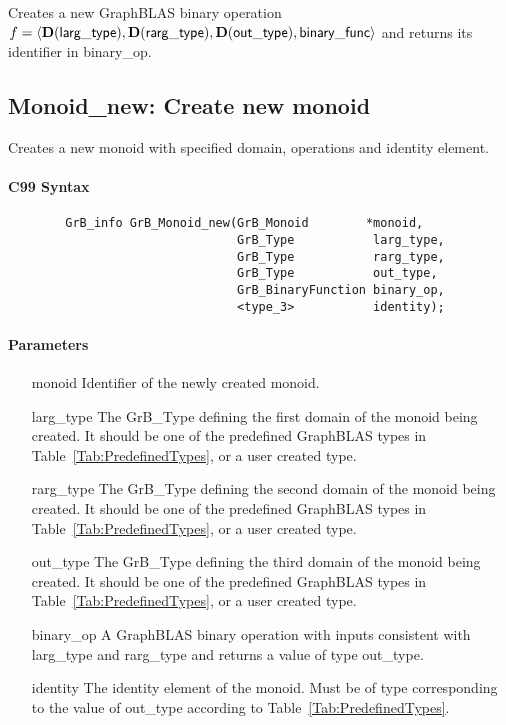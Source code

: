 Creates a new GraphBLAS binary operation $f = \langle \bold{D}({\sf larg\_type}), 
\bold{D}({\sf rarg\_type}), \bold{D}({\sf out\_type}), {\sf binary\_func} \rangle$ and returns its identifier in {\sf binary\_op}.




\subsection{{\sf Monoid\_new}: Create new monoid}

Creates a new monoid with specified domain, operations and identity element.

\paragraph{C99 Syntax}

\begin{verbatim}
        GrB_info GrB_Monoid_new(GrB_Monoid        *monoid,
                                GrB_Type           larg_type,
                                GrB_Type           rarg_type,
                                GrB_Type           out_type,
                                GrB_BinaryFunction binary_op,
                                <type_3>           identity);
\end{verbatim}

\paragraph{Parameters}

\begin{itemize}[leftmargin=1.1in]
    \item[{\sf monoid}]         Identifier of the newly created monoid.
    \item[{\sf larg\_type}]     The {\sf GrB\_Type} defining the first domain of the monoid 
    being created. It should be one of the predefined GraphBLAS types in
    Table~\ref{Tab:PredefinedTypes}, or a user created type.
    \item[{\sf rarg\_type}]     The {\sf GrB\_Type} defining the second domain of the monoid
    being created.  It should be one of the predefined GraphBLAS types in
    Table~\ref{Tab:PredefinedTypes}, or a user created type.
    \item[{\sf out\_type}]      The {\sf GrB\_Type} defining the third domain of the monoid 
    being created.  It should be one of the predefined GraphBLAS types in
    Table~\ref{Tab:PredefinedTypes}, or a user created type.
    \item[{\sf binary\_op}]     A GraphBLAS binary operation with inputs consistent
    with {\sf larg\_type} and {\sf rarg\_type} and returns a value of type {\sf out\_type}.
    \item[{\sf identity}]       The identity element of the monoid. 
    Must be of type corresponding to the value of {\sf out\_type} according to
    Table~\ref{Tab:PredefinedTypes}.
\end{itemize}

